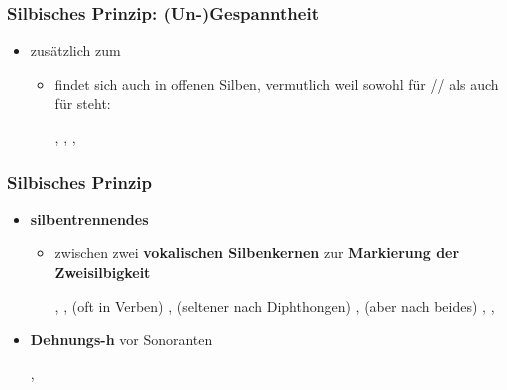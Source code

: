 \begin{frame}
\frametitle{Silbisches Prinzip: (Un-)Gespanntheit}

\begin{itemize}
	\item zusätzlich zum 
	
	\begin{itemize}
	
		\item {} findet sich auch in offenen Silben, vermutlich weil  sowohl für /\textschwa{}/ als auch für  steht:
		
		\ea {}, , , %
		\z
		
	\end{itemize}
\end{itemize}

\end{frame}



\begin{frame}
\frametitle{Silbisches Prinzip}

\begin{itemize}
	\item \textbf{silbentrennendes }
	
	\begin{itemize}
	\item zwischen zwei \textbf{vokalischen Silbenkernen} \ras zur \textbf{Markierung der Zweisilbigkeit}
	
	
	\eal
	\ex {}, , 
	\ex (oft in Verben) , 
	\ex (seltener nach Diphthongen) , 
	\ex (aber nach  beides) , , 
	\zl
	
	\end{itemize}

\pause 

	\item \textbf{Dehnungs-h} vor Sonoranten
	
	\ea	{}, 
	\z

\end{itemize}

\end{frame}


